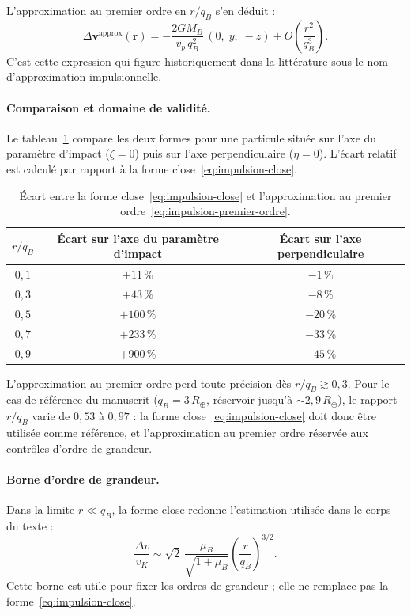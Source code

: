 \documentclass[11pt,a4paper,openany]{report}
\newcommand{\Rt}{R_{\oplus}}
\begin{document}
L'approximation au premier ordre en $r/q_B$ s'en déduit :
\begin{equation}
\Delta\mathbf{v}^{\text{approx}}(\mathbf{r})
=
-\frac{2GM_B}{v_p\,q_B^2}\,(0,\;y,\;-z)
+
O\!\left(\frac{r^2}{q_B^3}\right).
\label{eq:impulsion-premier-ordre}
\end{equation}
C'est cette expression qui figure historiquement dans la littérature sous le nom d'approximation
impulsionnelle.

\paragraph{Comparaison et domaine de validité.}
Le tableau~\ref{tab:impulsion-validite} compare les deux formes pour une particule située sur l'axe
du paramètre d'impact ($\zeta=0$) puis sur l'axe perpendiculaire ($\eta=0$). L'écart relatif est
calculé par rapport à la forme close~\eqref{eq:impulsion-close}.

\begin{table}[htbp]
\centering
\small
\caption{Écart entre la forme close~\eqref{eq:impulsion-close} et l'approximation au premier
ordre~\eqref{eq:impulsion-premier-ordre}.}
\label{tab:impulsion-validite}
\begin{tabular}{ccc}
\toprule
$r/q_B$ & Écart sur l'axe du paramètre d'impact & Écart sur l'axe perpendiculaire \\
\midrule
$0{,}1$ & $+11\,\%$ & $-1\,\%$ \\
$0{,}3$ & $+43\,\%$ & $-8\,\%$ \\
$0{,}5$ & $+100\,\%$ & $-20\,\%$ \\
$0{,}7$ & $+233\,\%$ & $-33\,\%$ \\
$0{,}9$ & $+900\,\%$ & $-45\,\%$ \\
\bottomrule
\end{tabular}
\end{table}

L'approximation au premier ordre perd toute précision dès $r/q_B\gtrsim0{,}3$. Pour le cas de
référence du manuscrit ($q_B=3\,\Rt$, réservoir jusqu'à $\sim2{,}9\,\Rt$), le rapport $r/q_B$ varie
de $0{,}53$ à $0{,}97$ : la forme close~\eqref{eq:impulsion-close} doit donc être utilisée comme
référence, et l'approximation au premier ordre réservée aux contrôles d'ordre de grandeur.

\paragraph{Borne d'ordre de grandeur.}
Dans la limite $r\ll q_B$, la forme close redonne l'estimation utilisée dans le corps du texte :
\begin{equation}
\frac{\Delta v}{v_K}\sim\sqrt2\,\frac{\mu_B}{\sqrt{1+\mu_B}}
\left(\frac{r}{q_B}\right)^{3/2}.
\label{eq:impulsion-borne}
\end{equation}
Cette borne est utile pour fixer les ordres de grandeur ; elle ne remplace pas la
forme~\eqref{eq:impulsion-close}.
\end{document}
